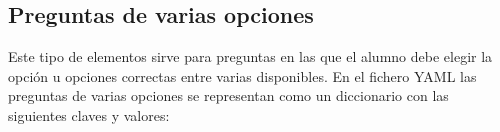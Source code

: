 \documentclass[]{article}
\begin{document}
	

\subsection{Preguntas de varias opciones}
Este tipo de elementos sirve para preguntas en las que el alumno debe elegir la opción u opciones correctas entre varias disponibles. En el fichero YAML las preguntas de varias opciones se representan como un diccionario con las siguientes claves y valores:
\end{document}
